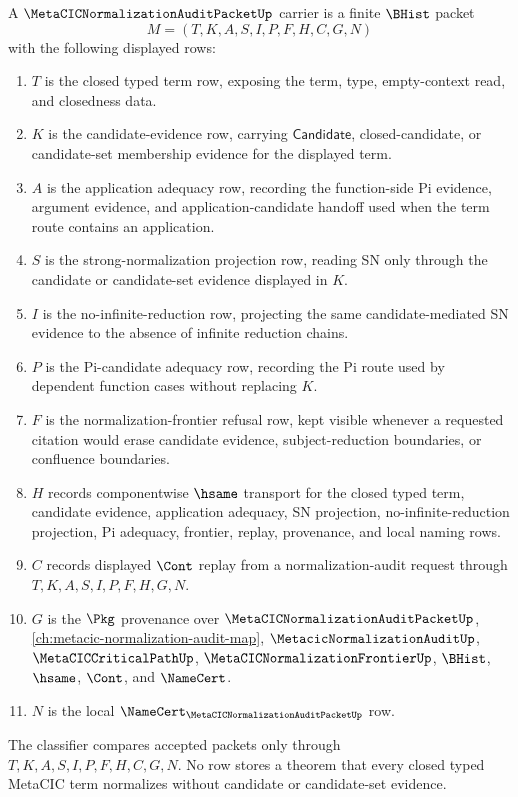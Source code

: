 \begin{definition}
\label{def:metacic-normalization-audit-packet-carrier}
A $\MetaCICNormalizationAuditPacketUp$ carrier is a finite $\BHist$ packet
$$
M=(T,K,A,S,I,P,F,H,C,G,N)
$$
with the following displayed rows:
\begin{enumerate}
\item $T$ is the closed typed term row, exposing the term, type, empty-context read, and closedness data.
\item $K$ is the candidate-evidence row, carrying $\mathsf{Candidate}$, closed-candidate, or candidate-set membership evidence for the displayed term.
\item $A$ is the application adequacy row, recording the function-side Pi evidence, argument evidence, and application-candidate handoff used when the term route contains an application.
\item $S$ is the strong-normalization projection row, reading SN only through the candidate or candidate-set evidence displayed in $K$.
\item $I$ is the no-infinite-reduction row, projecting the same candidate-mediated SN evidence to the absence of infinite reduction chains.
\item $P$ is the Pi-candidate adequacy row, recording the Pi route used by dependent function cases without replacing $K$.
\item $F$ is the normalization-frontier refusal row, kept visible whenever a requested citation would erase candidate evidence, subject-reduction boundaries, or confluence boundaries.
\item $H$ records componentwise $\hsame$ transport for the closed typed term, candidate evidence, application adequacy, SN projection, no-infinite-reduction projection, Pi adequacy, frontier, replay, provenance, and local naming rows.
\item $C$ records displayed $\Cont$ replay from a normalization-audit request through $T,K,A,S,I,P,F,H,G,N$.
\item $G$ is the $\Pkg$ provenance over $\MetaCICNormalizationAuditPacketUp$, \autoref{ch:metacic-normalization-audit-map}, $\MetacicNormalizationAuditUp$, $\MetaCICCriticalPathUp$, $\MetaCICNormalizationFrontierUp$, $\BHist$, $\hsame$, $\Cont$, and $\NameCert$.
\item $N$ is the local $\NameCert_{\MetaCICNormalizationAuditPacketUp}$ row.
\end{enumerate}
The classifier compares accepted packets only through $T,K,A,S,I,P,F,H,C,G,N$. No row stores a theorem that every closed typed MetaCIC term normalizes without candidate or candidate-set evidence.
\end{definition}

